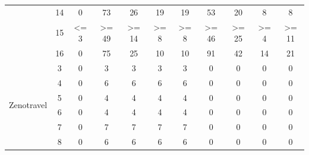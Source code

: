 \documentclass{article}
\theoremstyle{remark}
\begin{document}
{\begin{table}[ht]
\begin{tabular}{|cc||c||c|c|c|c||c|c|c|c|}
                                              & 14                       & 0                        & 73                 & 26                 & 19                & 19                & 53                 & 20                 & 8                 & 8                  \\ \cline{2-11} 
                                              & 15                       & \textless{}= 3           & \textgreater{}= 49 & \textgreater{}= 14 & \textgreater{}= 8 & \textgreater{}= 8 & \textgreater{}= 46 & \textgreater{}= 25 & \textgreater{}= 4 & \textgreater{}= 11 \\ \cline{2-11} 
                                              & 16                       & 0                        & 75                 & 25                 & 10                & 10                & 91                 & 42                 & 14                & 21                 \\ \hline \hline
\multirow{11}{*}{Zenotravel}                  & 3                        & 0                        & 3                  & 3                  & 3                 & 3                 & 0                  & 0                  & 0                 & 0                  \\ \cline{2-11} 
                                              & 4                        & 0                        & 6                  & 6                  & 6                 & 6                 & 0                  & 0                  & 0                 & 0                  \\ \cline{2-11} 
                                              & 5                        & 0                        & 4                  & 4                  & 4                 & 4                 & 0                  & 0                  & 0                 & 0                  \\ \cline{2-11} 
                                              & 6                        & 0                        & 4                  & 4                  & 4                 & 4                 & 0                  & 0                  & 0                 & 0                  \\ \cline{2-11} 
                                              & 7                        & 0                        & 7                  & 7                  & 7                 & 7                 & 0                  & 0                  & 0                 & 0                  \\ \cline{2-11} 
                                              & 8                        & 0                        & 6                  & 6                  & 6                 & 6                 & 0                  & 0                  & 0                 & 0                  \\ \cline{2-11} 

\end{tabular}
\end{table}}
\end{document}
